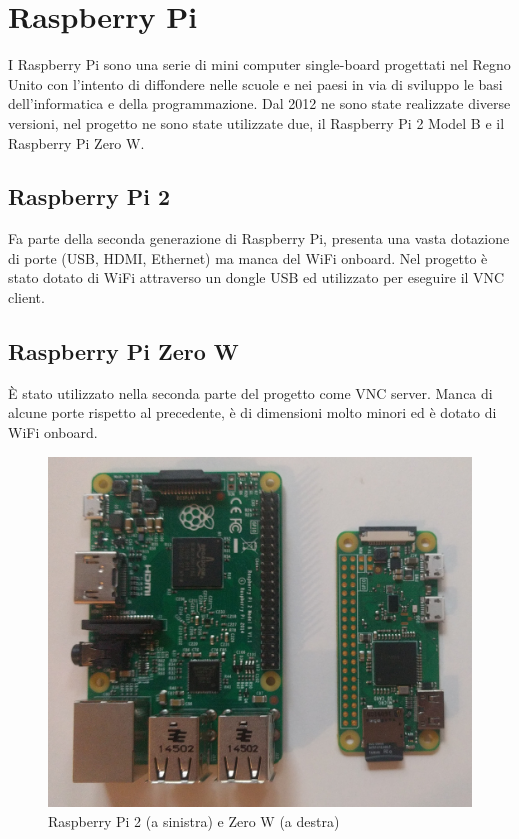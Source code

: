 \section{Raspberry Pi}

I Raspberry Pi sono una serie di mini computer single-board progettati nel Regno Unito con l'intento di diffondere nelle scuole e nei paesi in via di sviluppo le basi dell'informatica e della programmazione.
Dal 2012 ne sono state realizzate diverse versioni, nel progetto ne sono state utilizzate due, il Raspberry Pi 2 Model B e il Raspberry Pi Zero W.
    \subsection{Raspberry Pi 2}
    Fa parte della seconda generazione di Raspberry Pi, presenta una vasta dotazione di porte (USB, HDMI, Ethernet) ma manca del WiFi onboard. Nel progetto è stato dotato di WiFi attraverso un dongle USB ed utilizzato per eseguire il VNC client.
    \subsection{Raspberry Pi Zero W}
    È stato utilizzato nella seconda parte del progetto come VNC server. Manca di alcune porte rispetto al precedente, è di dimensioni molto minori ed è dotato di WiFi onboard.
\begin{figure}[ht]
\includegraphics[width=\textwidth]{../img/pi-comparison.jpg}
\centering
\caption{Raspberry Pi 2 (a sinistra) e Zero W (a destra)}
\end{figure}
